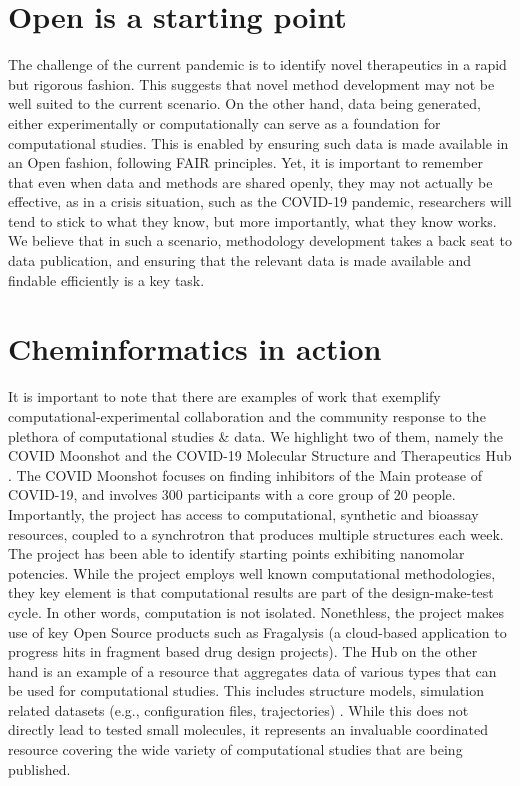 \documentclass{bmcart}
\begin{document}
\section*{Open is a starting point}

The challenge of the current pandemic is to identify novel
therapeutics in a rapid but rigorous fashion. This suggests that novel
method development may not be well suited to the current scenario. On
the other hand, data being generated, either experimentally or
computationally can serve as a foundation for computational
studies. This is enabled by ensuring such data is made available in an
Open fashion, following FAIR principles. Yet, it is important to
remember that even when data and methods are shared openly, they may
not actually be effective, as in a crisis situation, such as the
COVID-19 pandemic, researchers will tend to stick to what they know,
but more importantly, what they know works. We believe that in such a
scenario, methodology development takes a back seat to data
publication, and ensuring that the relevant data is made available and
findable efficiently is a key task.

\section*{Cheminformatics in action}
\label{sec:chem-acti}

It is important to note that there are examples of work that exemplify
computational-experimental collaboration and the community response to
the plethora of computational studies \& data. We highlight two of
them, namely the COVID Moonshot \cite{moonshot} and the COVID-19
Molecular Structure and Therapeutics Hub \cite{molssi}. The COVID
Moonshot focuses on finding inhibitors of the Main protease of
COVID-19, and involves 300 participants with a core group of 20
people. Importantly, the project has access to computational,
synthetic and bioassay resources, coupled to a synchrotron that
produces multiple structures each week. The project has been able to
identify starting points exhibiting nanomolar potencies. While the
project employs well known computational methodologies, they key
element is that computational results are part of the design-make-test
cycle. In other words, computation is not isolated. Nonethless, the
project makes use of key Open Source products such as Fragalysis (a
cloud-based application to progress hits in fragment based drug design
projects). The Hub on the other hand is an example of a resource that
aggregates data of various types that can be used for computational
studies. This includes structure models, simulation related datasets
(e.g., configuration files, trajectories) . While this does not
directly lead to tested small molecules, it represents an invaluable
coordinated resource covering the wide variety of computational
studies that are being published.
\end{document}
